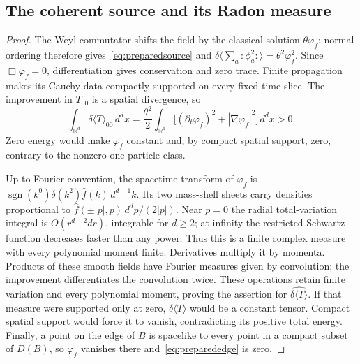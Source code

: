 \documentclass[12pt]{article}
\theoremstyle{definition}
\theoremstyle{remark}
\newcommand{\dT}{\delta\langle T\rangle}
\newcommand{\ev}[1]{\langle #1\rangle}
\begin{document}
\subsection{The coherent source and its Radon measure}
\label{app:prop:prepared}
\begin{proof}
The Weyl commutator shifts the field by the classical solution \(\theta\varphi_f\);
normal ordering therefore gives~\eqref{eq:preparedsource} and
\(\delta\ev{\sum_a:\!\phi_a^2\!:}=\theta^2\varphi_f^2\).
Since \(\Box\varphi_f=0\), differentiation gives conservation and zero trace.
Finite propagation makes its Cauchy data compactly supported on every fixed time slice.
The improvement in \(T_{00}\) is a spatial divergence, so
\[
\int_{\mathbb R^d}\dT_{00}\,d^dx
=\frac{\theta^2}{2}\int_{\mathbb R^d}
\big[(\partial_t\varphi_f)^2+|\nabla\varphi_f|^2\big]\,d^dx>0.
\]
Zero energy would make \(\varphi_f\) constant and, by compact spatial support, zero,
contrary to the nonzero one-particle class.

Up to Fourier convention, the spacetime transform of \(\varphi_f\) is
\(\operatorname{sgn}(k^0)\delta(k^2)\widehat f(k)\,d^{d+1}k\).
Its two mass-shell sheets carry densities proportional to
\(\widehat f(\pm|p|,p)\,d^dp/(2|p|)\).
Near \(p=0\) the radial total-variation integral is \(O(r^{d-2}dr)\), integrable for
\(d\ge2\); at infinity the restricted Schwartz function decreases faster than any power.
Thus this is a finite complex measure with every polynomial moment finite.
Derivatives multiply it by momenta. Products of these smooth fields have Fourier
measures given by convolution; the improvement differentiates the convolution twice.
These operations retain finite variation and every polynomial moment, proving the
assertion for \(\widehat{\dT}\).
If that measure were supported only at zero, \(\dT\) would be a constant tensor.
Compact spatial support would force it to vanish, contradicting its positive total energy.
Finally, a point on the edge of \(B\) is spacelike to every point in a compact subset
of \(D(B)\), so \(\varphi_f\) vanishes there and~\eqref{eq:preparededge} is zero.
\end{proof}
\end{document}
